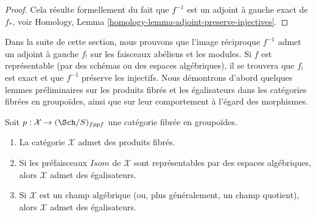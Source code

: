 \begin{proof}
Cela résulte formellement du fait que $f^{-1}$ est un adjoint à gauche
exact de $f_*$, voir
Homology, Lemma \ref{homology-lemma-adjoint-preserve-injectives}.
\end{proof}

\noindent
Dans la suite de cette section, nous prouvons que l'image réciproque $f^{-1}$ admet un
adjoint à gauche $f_!$ sur les faisceaux abéliens et les modules. Si $f$ est représentable (par
des schémas ou des espaces algébriques), il se trouvera que $f_!$ est exact
et que $f^{-1}$ préserve les injectifs. Nous démontrons d'abord quelques
lemmes préliminaires sur les produits fibrés et les égalisateurs dans les catégories
fibrées en groupoïdes, ainsi que sur leur comportement à l'égard des morphismes.

\begin{lemma}
\label{lemma-fibre-products}
Soit $p : \mathcal{X} \to (\Sch/S)_{fppf}$
une catégorie fibrée en groupoïdes.
\begin{enumerate}
\item La catégorie $\mathcal{X}$ admet des produits fibrés.
\item Si les préfaisceaux $\mathit{Isom}$ de $\mathcal{X}$
sont représentables par des espaces algébriques, alors $\mathcal{X}$ admet des égalisateurs.
\item Si $\mathcal{X}$ est un champ algébrique (ou, plus généralement,
un champ quotient), alors $\mathcal{X}$ admet des égalisateurs.
\end{enumerate}
\end{lemma}

